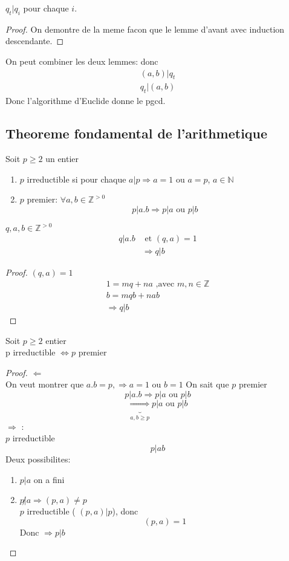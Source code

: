 \documentclass[../main.tex]{subfiles}
\begin{document}
\begin{lemma}
$q_t | q_i $ pour chaque $i$.
\end{lemma}
\begin{proof}
On demontre de la meme facon que le lemme d'avant avec induction descendante.
\end{proof}
On peut combiner les deux lemmes:
donc 
\begin{align*}
	(a,b) | q_t\\
	q_t | ( a,b)
\end{align*}
Donc l'algorithme d'Euclide donne le pgcd.
\subsection{Theoreme fondamental de l'arithmetique}
\begin{defn}[Entier]\label{defn:entier}
	Soit $p \geq 2$ un entier
	\begin{enumerate}
	\item $p$ irreductible si pour chaque $a | p  \Rightarrow a=1$ ou $a=p$,  $a \in \mathbb{N}$
	\item $p$ premier: $\forall a,b \in \mathbb{Z}^{>0}$ 
		\[ 
		p | a.b \Rightarrow p | a \text{ ou } p | b
		\]
	\end{enumerate}
\end{defn}
\begin{lemma}
$q, a,b \in \mathbb{Z}^{>0}$ 
\begin{align*}
	q | a.b &\text{ et } ( q,a) =1\\
		& \Rightarrow q | b
\end{align*}
\end{lemma}
\begin{proof}
	$(q,a) = 1$ 
	\begin{align*}
	1 = mq + na \text{ ,avec } m,n \in \mathbb{Z}\\
	b= mqb + nab\\
	\Rightarrow q | b
	\end{align*}
\end{proof}
\begin{propo}
Soit $p\geq 2$ entier\\
p irreductible $\iff p$ premier
\end{propo}
\begin{proof}
$\Leftarrow$ \\
On veut montrer que $a.b = p, \Rightarrow a=1 \text{ ou } b=1$
On sait que $p$ premier
\[ 
p | a.b \Rightarrow  p | a \text{ ou } p | b
\]
\[ 
\underbrace{\Rightarrow}_{a,b \geq p} p | a \text{ ou }  p |b
\]
$\Rightarrow$ :\\
$p$ irreductible
\[ 
p | ab
\]
Deux possibilites:\\
\begin{enumerate}
	\item $p|a$ on a fini 
	\item $p \not | a \Rightarrow ( p,a) \neq p$\\
		$p$ irreductible ( $(p,a) | p$), donc
		\[ 
			( p,a) =1
		\]
		Donc $\Rightarrow p | b$ 
\end{enumerate}
\end{proof}
\end{document}
